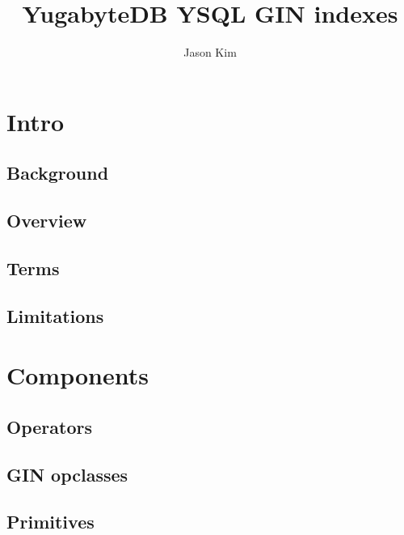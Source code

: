 \documentclass[11pt]{article}
\title{YugabyteDB YSQL GIN indexes}
\author{
    Jason Kim
}
\begin{document}
\maketitle
\tableofcontents

\newpage
\hypertarget{intro}{%
\section{Intro}\label{intro}}

\hypertarget{background}{%
\subsection{Background}\label{background}}


\hypertarget{overview}{%
\subsection{Overview}\label{overview}}


\hypertarget{terms}{%
\subsection{Terms}\label{terms}}


\hypertarget{limitations}{%
\subsection{Limitations}\label{limitations}}


\newpage
\hypertarget{components}{%
\section{Components}\label{components}}


\hypertarget{operators}{%
\subsection{Operators}\label{operators}}


\hypertarget{gin-opclasses}{%
\subsection{GIN opclasses}\label{gin-opclasses}}


\hypertarget{primitives}{%
\subsection{Primitives}\label{primitives}}

\end{document}
